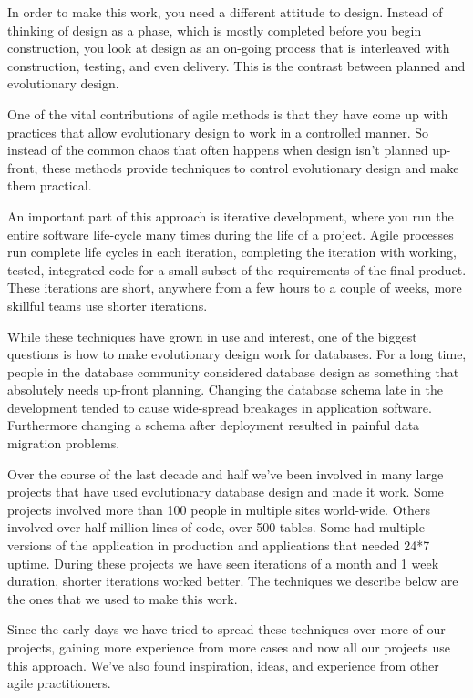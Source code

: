 \documentclass[12pt]{article}
\begin{document}
In order to make this work, you need a different attitude to design.
Instead of thinking of design as a phase, which is mostly completed
before you begin construction, you look at design as an on-going process
that is interleaved with construction, testing, and even delivery. This
is the contrast between planned and evolutionary design.

One of the vital contributions of agile methods is that they have come
up with practices that allow evolutionary design to work in a controlled
manner. So instead of the common chaos that often happens when design
isn't planned up-front, these methods provide techniques to control
evolutionary design and make them practical.

An important part of this approach is iterative development, where you
run the entire software life-cycle many times during the life of a
project. Agile processes run complete life cycles in each iteration,
completing the iteration with working, tested, integrated code for a
small subset of the requirements of the final product. These iterations
are short, anywhere from a few hours to a couple of weeks, more skillful
teams use shorter iterations.

While these techniques have grown in use and interest, one of the
biggest questions is how to make evolutionary design work for databases.
For a long time, people in the database community considered database
design as something that absolutely needs up-front planning. Changing
the database schema late in the development tended to cause wide-spread
breakages in application software. Furthermore changing a schema after
deployment resulted in painful data migration problems.

Over the course of the last decade and half we've been involved in many
large projects that have used evolutionary database design and made it
work. Some projects involved more than 100 people in multiple sites
world-wide. Others involved over half-million lines of code, over 500
tables. Some had multiple versions of the application in production and
applications that needed 24*7 uptime. During these projects we have seen
iterations of a month and 1 week duration, shorter iterations worked
better. The techniques we describe below are the ones that we used to
make this work.

Since the early days we have tried to spread these techniques over more
of our projects, gaining more experience from more cases and now all our
projects use this approach. We've also found inspiration, ideas, and
experience from other agile practitioners.
\end{document}
